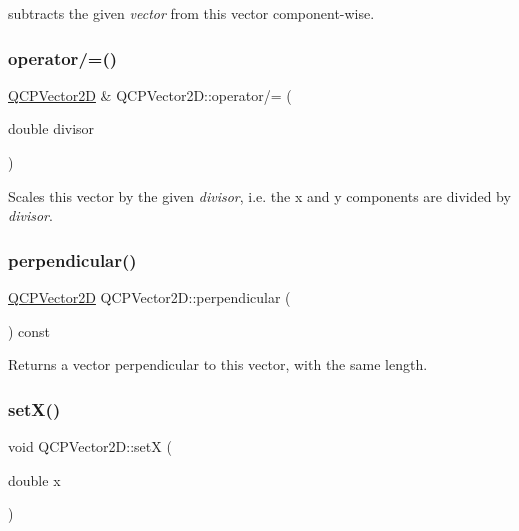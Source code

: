 subtracts the given {\itshape vector} from this vector component-\/wise. \mbox{\label{classQCPVector2D_aefa55eb9282c066a330ca281881e0ec0}} 
\subsubsection{\texorpdfstring{operator/=()}{operator/=()}}
{\footnotesize\ttfamily \hyperlink{classQCPVector2D}{Q\+C\+P\+Vector2D} \& Q\+C\+P\+Vector2\+D\+::operator/= (\begin{DoxyParamCaption}\item[{double}]{divisor }\end{DoxyParamCaption})}

Scales this vector by the given {\itshape divisor}, i.\+e. the x and y components are divided by {\itshape divisor}. \mbox{\label{classQCPVector2D_a0e08d09f9027784237e302e32290b001}} 
\subsubsection{\texorpdfstring{perpendicular()}{perpendicular()}}
{\footnotesize\ttfamily \hyperlink{classQCPVector2D}{Q\+C\+P\+Vector2D} Q\+C\+P\+Vector2\+D\+::perpendicular (\begin{DoxyParamCaption}{ }\end{DoxyParamCaption}) const\hspace{0.3cm}{\ttfamily [inline]}}

Returns a vector perpendicular to this vector, with the same length. \mbox{\label{classQCPVector2D_ab4249e6ce7bfc37be56f014c54b761ae}} 
\subsubsection{\texorpdfstring{set\+X()}{setX()}}
{\footnotesize\ttfamily void Q\+C\+P\+Vector2\+D\+::setX (\begin{DoxyParamCaption}\item[{double}]{x }\end{DoxyParamCaption})\hspace{0.3cm}{\ttfamily [inline]}}


